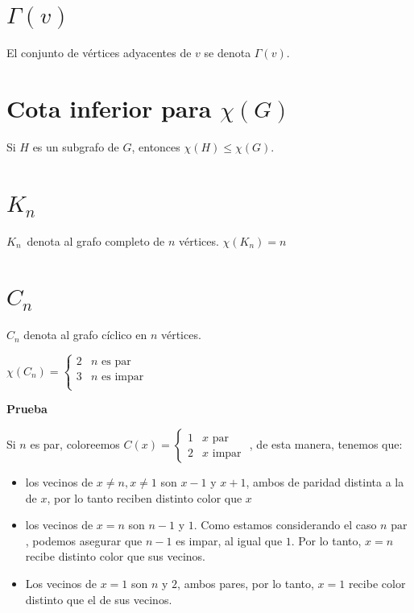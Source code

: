 \documentclass[10pt,a4paper]{article}
\begin{document}
\section*{$\Gamma(v)$}

El conjunto de vértices adyacentes de $v$ se denota $\Gamma(v)$.

\section*{Cota inferior para $\chi(G)$}

Si $H$ es un subgrafo de $G$, entonces $\chi(H)\leq \chi(G)$.

\section*{$K_n$}

$K_n$ denota al grafo completo de $n $ vértices. $\chi(K_n) = n$

\section*{$C_n$}

$C_n$ denota al grafo cíclico en $n$ vértices.

\begin{center}
$\chi(C_n) = \begin{cases} 2 & n \text{ es par}\\ 3 & n \text{ es impar}\\ \end{cases}$
\end{center}

\textbf{Prueba}

Si $n$ es par, coloreemos $C(x) = 
\begin{cases}
1 & x \text{ par }\\
2 & x \text{ impar }
\end{cases}$, de esta manera, tenemos que:

\begin{itemize}

	\item los vecinos de $x\neq n, x\neq 1$ son $x-1$ y $x +1$, ambos de paridad distinta a la de $x$, por lo tanto reciben distinto color que $x$
	\item los vecinos de $x=n$ son $n-1$ y $1$. Como estamos considerando el caso $n \text{ par }$, podemos asegurar que $n-1$ es impar, al igual que $1$. Por lo tanto, $x=n$ recibe distinto color que sus vecinos.
	\item Los vecinos de $x = 1$ son $n$ y $2$, ambos pares, por lo tanto, $x=1$ recibe color distinto que el de sus vecinos.
\end{itemize}
\end{document}
